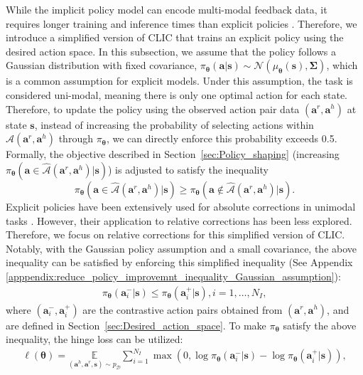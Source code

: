 While the implicit policy model can encode multi-modal feedback data, it requires longer training and inference times than explicit policies \cite{2022_implicit_BC, 2023_diffusionpolicy}.
Therefore, we introduce a simplified version of CLIC that trains an explicit policy using the desired action space.
In this subsection, we assume that the policy follows a Gaussian distribution with fixed covariance, $\pi_{\bm \theta}(\bm a | \bm s) \sim\mathcal{N} (\mu_{\bm \theta}(\bm s), \bm \Sigma)$,  which is a common assumption for explicit models.
Under this assumption, the task is considered uni-modal, meaning there is only one optimal action for each state. 
Therefore, to update the policy using the observed action pair data $(\bm a^r, \bm a^h)$ at state $\bm s$, instead of increasing the probability of selecting actions within $\hat{\mathcal{A}}(\bm{a}^r, \bm{a}^h)$ through  $\pi_{\bm \theta}$, we can directly enforce this probability exceeds 0.5.
Formally, the objective described in Section~\ref{sec:Policy_shaping} (increasing $\pi_{\bm \theta}(\bm{a} \in \hat{\mathcal{A}}(\bm{a}^r, \bm{a}^h) | \bm{s})$) is adjusted to satisfy the inequality 
\begin{equation}
    \pi_{\bm \theta}(\bm a \in \hat{\mathcal{A}}{(\bm a^r, \bm a^h)}| \bm{s}) \geq \pi_{\bm \theta}(\bm a \notin \hat{\mathcal{A}}{(\bm a^r, \bm a^h)}| \bm{s}).
    \label{eq:policy_improvement_distribution}
\end{equation}
Explicit policies have been extensively used for absolute corrections in unimodal tasks \cite{2011_DAgger, 2019_HG_DAgger, 2023_Survey_LfD}. However, their application to relative corrections has been less explored. Therefore, we focus on relative corrections for this simplified version of CLIC. 
Notably, with the Gaussian policy assumption and a small covariance, the above inequality can be satisfied by enforcing this simplified inequality (See Appendix \ref{apppendix:reduce_policy_improvemnt_inequality_Gaussian_assumption}):
\begin{align}
    \pi_{\bm \theta}(\bm a^{-}_i|\bm s) \leq \pi_{\bm \theta}(\bm a^{+}_i|\bm s), i = 1, \dots, N_I,
    \label{eq:policy_improvement}
\end{align}
where $(\bm a^{-}_i, \bm a^{+}_i)$ are the contrastive action pairs obtained from $(\bm a^r, \bm a^h)$, and are defined in Section~\ref{sec:Desired_action_space}.  
To make $\pi_{\bm \theta}$ satisfy the above inequality, the hinge loss can be utilized:
\begin{align*}
\ell (\bm\theta ) =  \!\!\!\! \underset{(\bm{a}^{h}, \bm{a}^{r}, \bm{s}) \sim p_{\mathcal D}}{\mathbb{E}} \sum_{i = 1}^{N_I} \max (0,  \log \pi_{\bm \theta}(\bm a^{-}_i|\bm s) - \log\pi_{\bm \theta}(\bm a^{+}_i|\bm s)  ), 
\label{eq:loss_policy_improvement}
\end{align*}
